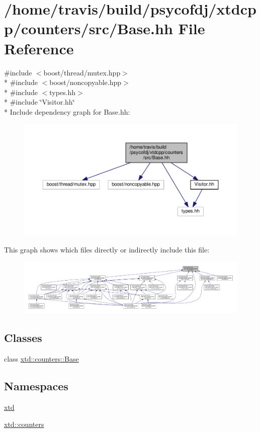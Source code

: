 \hypertarget{Base_8hh}{\section{/home/travis/build/psycofdj/xtdcpp/counters/src/\-Base.hh File Reference}
\label{Base_8hh}
}
{\ttfamily \#include $<$boost/thread/mutex.\-hpp$>$}\\*
{\ttfamily \#include $<$boost/noncopyable.\-hpp$>$}\\*
{\ttfamily \#include $<$types.\-hh$>$}\\*
{\ttfamily \#include \char`\"{}Visitor.\-hh\char`\"{}}\\*
Include dependency graph for Base.\-hh\-:
\nopagebreak
\begin{figure}[H]
\begin{center}
\leavevmode
\includegraphics[width=350pt]{Base_8hh__incl}
\end{center}
\end{figure}
This graph shows which files directly or indirectly include this file\-:
\nopagebreak
\begin{figure}[H]
\begin{center}
\leavevmode
\includegraphics[width=350pt]{Base_8hh__dep__incl}
\end{center}
\end{figure}
\subsection*{Classes}
\begin{DoxyCompactItemize}
\item 
class \hyperlink{classxtd_1_1counters_1_1Base}{xtd\-::counters\-::\-Base}
\end{DoxyCompactItemize}
\subsection*{Namespaces}
\begin{DoxyCompactItemize}
\item 
\hyperlink{namespacextd}{xtd}
\item 
\hyperlink{namespacextd_1_1counters}{xtd\-::counters}
\end{DoxyCompactItemize}

